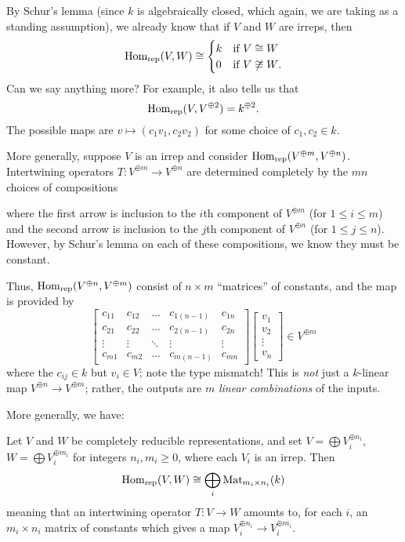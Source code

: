 By Schur's lemma (since $k$ is algebraically closed,
which again, we are taking as a standing assumption),
we already know that if $V$ and $W$ are irreps, then
\[
	\operatorname{Hom}_{\mathrm{rep}}(V,W) \cong
	\begin{cases}
		k & \text{if $V \cong W$} \\
		0 & \text{if $V \not\cong W$}.
	\end{cases}
\]
Can we say anything more?
For example, it also tells us that
\[ \operatorname{Hom}_{\mathrm{rep}}(V, V^{\oplus 2}) = k^{\oplus 2}. \]
The possible maps are $v \mapsto (c_1v_1, c_2v_2)$ for some choice of $c_1, c_2 \in k$.

More generally, suppose $V$ is an irrep and consider
$\operatorname{Hom}_{\mathrm{rep}}(V^{\oplus m}, V^{\oplus n})$.
Intertwining operators
$T \colon V^{\oplus m} \to V^{\oplus n}$
are determined completely
by the $mn$ choices of compositions
\begin{center}
\end{center}
where the first arrow is inclusion to the $i$th component of $V^{\oplus m}$
(for $1 \le i \le m$) and the second arrow is inclusion to the $j$th
component of $V^{\oplus n}$ (for $1 \le j \le n$).
However, by Schur's lemma on each of these compositions,
we know they must be constant.

Thus, $\operatorname{Hom}_{\mathrm{rep}}(V^{\oplus n}, V^{\oplus m})$ consist of $n \times m$ ``matrices''
of constants, and the map is provided by
\[
	\begin{bmatrix}
		c_{11} & c_{12} & \dots & c_{1(n-1)} & c_{1n} \\
		c_{21} & c_{22} & \dots & c_{2(n-1)} & c_{2n} \\
		\vdots & \vdots & \ddots & \vdots & \vdots \\
		c_{m1} & c_{m2} & \dots & c_{m(n-1)} & c_{mn}
	\end{bmatrix}
	\begin{bmatrix} v_1 \\ v_2 \\ \vdots \\ v_n \end{bmatrix}
	\in V^{\oplus m}
\]
where the $c_{ij} \in k$ but $v_i \in V$; note the type mismatch!
This is \emph{not} just a $k$-linear map $V^{\oplus n} \to V^{\oplus m}$;
rather, the outputs are $m$ \emph{linear combinations} of the inputs.

More generally, we have:
\begin{theorem}
	\label{thm:compred_schur}
	Let $V$ and $W$ be completely reducible representations,
	and set $V = \bigoplus V_i^{\oplus n_i}$, $W = \bigoplus V_i^{\oplus m_i}$
	for integers $n_i, m_i \ge 0$, where each $V_i$ is an irrep.
	Then
	\[ \operatorname{Hom}_{\mathrm{rep}}(V, W)
		\cong \bigoplus_i \mathrm{Mat}_{m_i \times n_i}(k) \]
	meaning that an intertwining operator $T \colon V \to W$
	amounts to, for each $i$, an $m_i \times n_i$ matrix of constants
	which gives a map $V_i^{\oplus n_i} \to V_i^{\oplus m_i}$.
\end{theorem}

